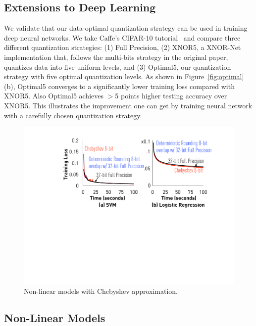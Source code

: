 \documentclass{article}
\begin{document}
\vspace{-1em}
\subsection{Extensions to Deep Learning}
\vspace{-0.5em}

We validate that our data-optimal quantization
strategy can be used in training deep neural
networks. We take Caffe's CIFAR-10 tutorial~\cite{Caffe:CIFAR10}
and compare three different quantization
strategies: (1) Full Precision, (2) XNOR5, 
a XNOR-Net implementation that, follows
the multi-bits strategy in
the original paper, quantizes data into
five uniform levels, and (3)
Optimal5, our quantization strategy with
five optimal quantization levels. As
shown in Figure~\ref{fig:optimal}(b), Optimal5
converges to a significantly lower training 
loss compared with XNOR5. Also
Optimal5 achieves $>$5 points higher testing accuracy over XNOR5.
This illustrates the improvement
one can get by training neural network with
a carefully chosen quantization strategy.



\begin{figure}[t]
\centering
\includegraphics[width=0.7\columnwidth]{final-experiments/chebyshev} 
\vspace{-1em}
\caption{Non-linear models with Chebyshev approximation.}
\vspace{-1.5em}
\label{fig:chebyshev}
\end{figure}

\vspace{-1em}
\subsection{Non-Linear Models}
\vspace{-0.5em}
\end{document}

